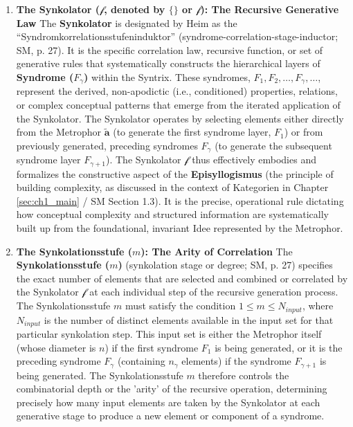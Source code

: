 \documentclass[
    12pt,              %
    a4paper,           %
    headings=normal,   %
    twoside=true,      %
    BCOR=8mm,          %
]{scrbook}
\newcommand{\q}[1]{\enquote{#1}}
\newcommand{\metrophor}{\bm{\widetilde{a}}}
\newcommand{\synkolator}{\mathcal{f}}
\newcommand{\synkolationsstufe}{m}
\newcommand{\syndrom}{F}
\begin{document}
\begin{enumerate}[label=\arabic*.]
    \item  \textbf{The Synkolator (\(\synkolator\), denoted by \(\{ \}\) or \(\mathcal{f}\)): The Recursive Generative Law}
        The \textbf{Synkolator} is designated by Heim as the \q{Syndromkorrelationsstufeninduktor} (syndrome-correlation-stage-inductor; SM, p. 27). It is the specific correlation law, recursive function, or set of generative rules that systematically constructs the hierarchical layers of \textbf{Syndrome (\(\syndrom_\gamma\))} within the Syntrix. These syndromes, \( \syndrom_1, \syndrom_2, \ldots, \syndrom_\gamma, \ldots \), represent the derived, non-apodictic (i.e., conditioned) properties, relations, or complex conceptual patterns that emerge from the iterated application of the Synkolator. The Synkolator operates by selecting elements either directly from the Metrophor \(\metrophor\) (to generate the first syndrome layer, \(\syndrom_1\)) or from previously generated, preceding syndromes \(\syndrom_\gamma\) (to generate the subsequent syndrome layer \(\syndrom_{\gamma+1}\)). The Synkolator \(\synkolator\) thus effectively embodies and formalizes the constructive aspect of the \textbf{Episyllogismus} (the principle of building complexity, as discussed in the context of Kategorien in Chapter \ref{sec:ch1_main} / SM Section 1.3). It is the precise, operational rule dictating how conceptual complexity and structured information are systematically built up from the foundational, invariant Idee represented by the Metrophor.

    \item  \textbf{The Synkolationsstufe (\(\synkolationsstufe\)): The Arity of Correlation}
        The \textbf{Synkolationsstufe (\(\synkolationsstufe\))} (synkolation stage or degree; SM, p. 27) specifies the exact number of elements that are selected and combined or correlated by the Synkolator \(\synkolator\) at each individual step of the recursive generation process. The Synkolationsstufe \(\synkolationsstufe\) must satisfy the condition \(1 \le \synkolationsstufe \le N_{input}\), where \(N_{input}\) is the number of distinct elements available in the input set for that particular synkolation step. This input set is either the Metrophor itself (whose diameter is \(n\)) if the first syndrome \(\syndrom_1\) is being generated, or it is the preceding syndrome \(\syndrom_\gamma\) (containing \(n_\gamma\) elements) if the syndrome \(\syndrom_{\gamma+1}\) is being generated. The Synkolationsstufe \(\synkolationsstufe\) therefore controls the combinatorial depth or the 'arity' of the recursive operation, determining precisely how many input elements are taken by the Synkolator at each generative stage to produce a new element or component of a syndrome.
\end{enumerate}
\end{document}
